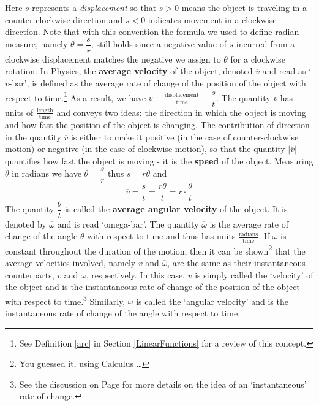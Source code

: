\documentclass[12pt]{ximera}
\begin{document}
Here $s$ represents a \textit{displacement} so that  $s > 0$ means the object is traveling in a counter-clockwise direction and $s<0$ indicates movement in a clockwise direction. Note that with this convention the formula we used to define radian measure, namely $\theta = \dfrac{s}{r}$, still holds since a negative value of $s$ incurred from a clockwise displacement matches the negative we assign to $\theta$ for a clockwise rotation.   In Physics, the \textbf{average velocity}  of the object, denoted $\overline{v}$ and read as `$v$-bar', is defined as the average rate of change of the position of the object with respect to time.\footnote{See Definition \ref{arc} in Section \ref{LinearFunctions} for a review of this concept.} As a result, we have $\overline{v} = \frac{\text{displacement}}{\text{time}} = \dfrac{s}{t}$.  The quantity $\overline{v}$ has units of $\frac{\text{length}}{\text{time}}$ and conveys two ideas:  the direction in which the object is moving and how fast the position of the object is changing.  The contribution of direction in the quantity $\overline{v}$ is either to make it positive (in the case of counter-clockwise motion) or negative (in the case of clockwise motion), so that the quantity $\left| \overline{v} \right|$ quantifies how fast the object is moving - it is the \textbf{speed} of the object. Measuring $\theta$ in radians we have $\theta = \dfrac{s}{r}$ thus $s = r \theta$ and  \[ \overline{v} = \frac{s}{t} = \frac{r \theta}{t} = r \cdot \frac{\theta}{t} \] The quantity $\dfrac{\theta}{t}$ is called the \textbf{average angular velocity} of the object.  It is denoted by $\overline{\omega}$ and is read `omega-bar'.  The quantity $\overline{\omega}$ is the average rate of change of the angle $\theta$ with respect to time and thus has units $\frac{\text{radians}}{\text{time}}$. If $\overline{\omega}$ is constant throughout the duration of the motion, then it can be shown\footnote{You guessed it, using Calculus \ldots} that the average  velocities involved, namely $\overline{v}$ and $\overline{\omega}$, are the same as their instantaneous counterparts, $v$ and $\omega$, respectively.  In this case, $v$ is simply called the `velocity' of the object and is the instantaneous rate of change  of the position of the object with respect to time.\footnote{See the discussion on Page \pageref{instantaneousrateofchange} for more details on the idea of an `instantaneous' rate of change.}  Similarly,  $\omega$ is called the `angular velocity' and is the instantaneous rate of change of the angle with respect to time. 
\end{document}
